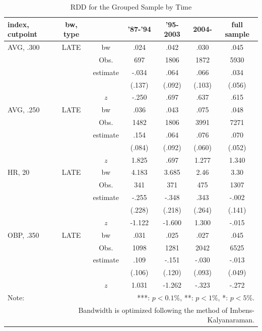 \documentclass[dvipdfmx,12pt]{beamer}
\begin{document}
\begin{frame}
  \begin{table}
    \centering
    \caption{RDD for the Grouped Sample by Time}
    \label{RDD_Era}
    \tiny
    \begin{tabular}{lcccccc} \hline
      index, cutpoint & bw, type &  &'87-'94 & '95-2003 & 2004- &full sample \\ \hline \hline
      AVG, .300 & LATE & bw & .024 & .042 & .030 & .045 \\
      &  & Obs. & 697 & 1806 & 1872 & 5930 \\
      &  & estimate & -.034 & .064 & .066 & .034 \\
      &  & & (.137) & (.092) & (.103) & (.056) \\
      & & $z$ & -.250 & .697 & .637 & .615 \\ \hline
      AVG, .250 & LATE & bw & .036 & .043 &.075 & .048 \\
      &  & Obs. & 1482 & 1806 & 3991 & 7271 \\
      &  & estimate & .154 & .064 & .076 & .070 \\
      &  & & (.084) & (.092) & (.060) & (.052) \\
      & & $z$ & 1.825 & .697 & 1.277 & 1.340 \\ \hline
      HR, 20 & LATE & bw & 4.183 & 3.685 & 2.46 & 3.30 \\
      &  & Obs. & 341 & 371 & 475 & 1307 \\
      &  & estimate & -.255 & -.348 & .343 & -.002 \\
      &  & & (.228) & (.218) & (.264) & (.141) \\
      & & $z$ & -1.122 & -1.600 & 1.300 & -.015 \\ \hline
      OBP, .350 & LATE & bw & .031 & .025 & .027 & .045 \\
      &  & Obs. & 1098 & 1281 & 2042 & 6525 \\
      &  & estimate & .109 & -.151 & -.030 & -.013 \\
      &  & & (.106) & (.120) & (.093) & (.049) \\
      & & $z$ & 1.031 & -1.262 & -.323 & -.272 \\ \hline
      Note: & \multicolumn{6}{r}{***: $p<0.1\%$, **: $p<1\%$, *: $p<5\%$.} \\
      & \multicolumn{6}{r}{Bandwidth is optimized following the method of Imbens-Kalyanaraman.}
    \end{tabular}
  \end{table}
\end{frame}
\end{document}
